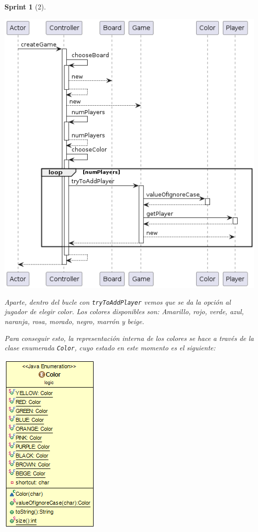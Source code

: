 \documentclass[12pt,a4paper,openright]{book}
\theoremstyle{break}
\newtheorem*{sprint}{Sprint}
\begin{document}
\begin{sprint}[2]
\begin{center}
\includegraphics[scale=0.5]{Controller.createGame()-sprint2.png} 
\end{center}

Aparte, dentro del bucle con \texttt{tryToAddPlayer} vemos que se da la opción al jugador de elegir color. Los colores disponibles son: Amarillo, rojo, verde, azul, naranja, rosa, morado, negro, marrón y beige.

Para conseguir esto, la representación interna de los colores se hace a través de la clase enumerada \texttt{Color}, cuyo estado en este momento es el siguiente:

\begin{center}
\includegraphics[scale=0.9]{Color-sprint2.png} 
\end{center}

\end{sprint}
\end{document}
